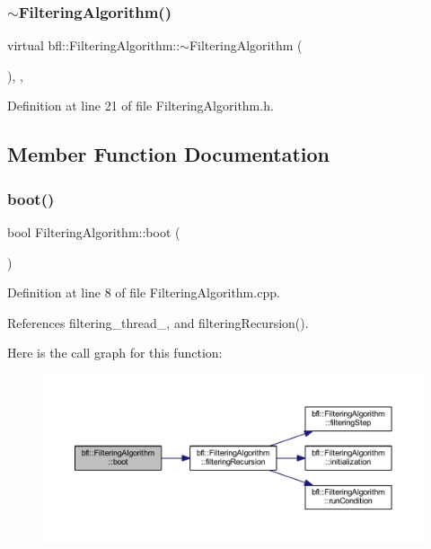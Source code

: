 \subsubsection{\texorpdfstring{$\sim$\+Filtering\+Algorithm()}{~FilteringAlgorithm()}}
{\footnotesize\ttfamily virtual bfl\+::\+Filtering\+Algorithm\+::$\sim$\+Filtering\+Algorithm (\begin{DoxyParamCaption}{ }\end{DoxyParamCaption})\hspace{0.3cm}{\ttfamily [inline]}, {\ttfamily [virtual]}, {\ttfamily [noexcept]}}



Definition at line 21 of file Filtering\+Algorithm.\+h.



\subsection{Member Function Documentation}
\mbox{\label{classbfl_1_1FilteringAlgorithm_a96651f8464190c0a56d79219a1017147}} 
\subsubsection{\texorpdfstring{boot()}{boot()}}
{\footnotesize\ttfamily bool Filtering\+Algorithm\+::boot (\begin{DoxyParamCaption}{ }\end{DoxyParamCaption})}



Definition at line 8 of file Filtering\+Algorithm.\+cpp.



References filtering\+\_\+thread\+\_\+, and filtering\+Recursion().

Here is the call graph for this function\+:
\nopagebreak
\begin{figure}[H]
\begin{center}
\leavevmode
\includegraphics[width=350pt]{classbfl_1_1FilteringAlgorithm_a96651f8464190c0a56d79219a1017147_cgraph}
\end{center}
\end{figure}
\mbox{\label{classbfl_1_1FilteringAlgorithm_a139fe290f73939e72c88cb43c8ef7544}} 

